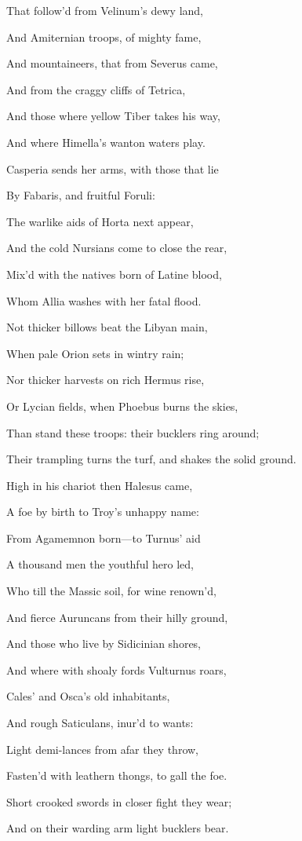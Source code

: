 That follow’d from Velinum’s dewy land,

And Amiternian troops, of mighty fame,

And mountaineers, that from Severus came,

And from the craggy cliffs of Tetrica,

And those where yellow Tiber takes his way,

And where Himella’s wanton waters play.

Casperia sends her arms, with those that lie

By Fabaris, and fruitful Foruli:

The warlike aids of Horta next appear,

And the cold Nursians come to close the rear,

Mix’d with the natives born of Latine blood,

Whom Allia washes with her fatal flood.

Not thicker billows beat the Libyan main,

When pale Orion sets in wintry rain;

Nor thicker harvests on rich Hermus rise,

Or Lycian fields, when Phoebus burns the skies,

Than stand these troops: their bucklers ring around;

Their trampling turns the turf, and shakes the solid ground.

High in his chariot then Halesus came,

A foe by birth to Troy’s unhappy name:

From Agamemnon born—to Turnus’ aid

A thousand men the youthful hero led,

Who till the Massic soil, for wine renown’d,

And fierce Auruncans from their hilly ground,

And those who live by Sidicinian shores,

And where with shoaly fords Vulturnus roars,

Cales’ and Osca’s old inhabitants,

And rough Saticulans, inur’d to wants:

Light demi-lances from afar they throw,

Fasten’d with leathern thongs, to gall the foe.

Short crooked swords in closer fight they wear;

And on their warding arm light bucklers bear.

